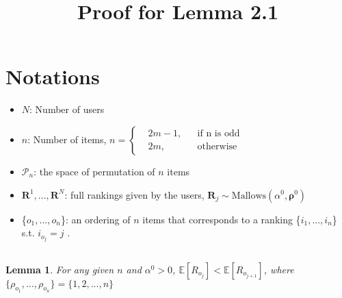 \documentclass[11pt, oneside]{article}   	%
\title{Proof for Lemma 2.1}
\author{}
\date{}							%
\newtheorem{lemma}[theorem]{Lemma}
\begin{document}
\maketitle
\section{Notations}
\begin{itemize}
	\item {$N$: Number of users}
	
	\item {$n$: Number of items,    $
		n = \left \{
		\begin{aligned}
		&2m-1, && \text{if n is odd} \\
		&2m, && \text{otherwise}
		\end{aligned} \right.
		$}
	
	\item{$\mathcal{P}_n$: the space of permutation of $n$ items}
	\item {$\bm{R}^1,...,\bm{R}^N$: full rankings given by the users, $\bm{R}_j \sim \text{Mallows}(\alpha^0, \bm{\rho}^0)$}
	
	\item{ \{$o_1, ..., o_n$\}: an ordering of $n$ items that corresponds to a ranking \{$i_1, ..., i_n$\} s.t. $i_{o_j} = j$ }.
\end{itemize}

\subsection{}
\begin{lemma} 
	For any given $n$ and $\alpha^0>0$, $\mathbb{E}[{R}_{o_j}]<\mathbb{E}[{R}_{o_{j+1}}]$, where $\{\rho_{o_1}, ..., \rho_{o_n}\} = \{1, 2, ..., n\}$
	
\end{lemma}
\end{document}
